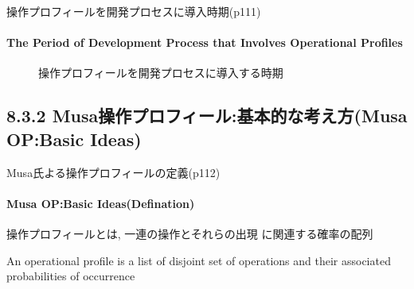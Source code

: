 \begin{frame}{操作プロフィールを開発プロセスに導入時期(p111)}
\framesubtitle{The Period of Development Process that Involves Operational Profiles}
\begin{figure}
\begin{center}
\begin{overprint}
 \begin{center}\end{center}
 \begin{center}\end{center}
 \begin{center}\end{center}
\end{overprint}
\caption{操作プロフィールを開発プロセスに導入する時期}
\end{center}
\end{figure}
\end{frame}
\subsection{8.3.2 Musa操作プロフィール:基本的な考え方(Musa OP:Basic Ideas)}
\begin{frame}[shrink=10]{Musa氏よる操作プロフィールの定義(p112)}
\framesubtitle{Musa OP:Basic Ideas(Defination)}
\begin{definationfc}[操作プロフィール]
操作プロフィールとは, 一連の操作とそれらの出現
に関連する確率の配列 

An operational profile is a list of disjoint set of operations
and their associated probabilities of occurrence

\end{definationfc}


\end{frame}

